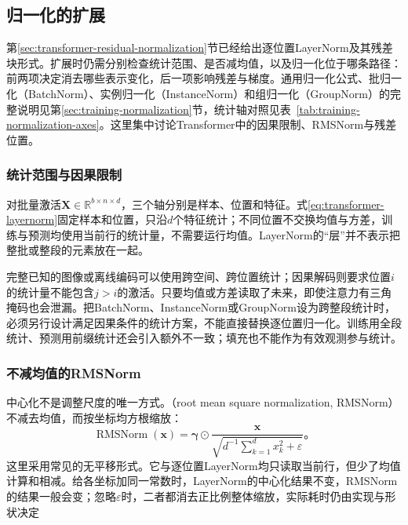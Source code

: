 \subsection{归一化的扩展}
\label{sec:transformer-normalization-extensions}

第\ref{sec:transformer-residual-normalization}节已经给出逐位置LayerNorm及其残差块形式。扩展时仍需分别检查统计范围、是否减均值，以及归一化位于哪条路径：前两项决定消去哪些表示变化，后一项影响残差与梯度。通用归一化公式、批归一化（BatchNorm）、实例归一化（InstanceNorm）和组归一化（GroupNorm）的完整说明见第\ref{sec:training-normalization}节，统计轴对照见表~\ref{tab:training-normalization-axes}。这里集中讨论Transformer中的因果限制、RMSNorm与残差位置。

\subsubsection{统计范围与因果限制}

对批量激活$\bm X\in\mathbb R^{b\times n\times d}$，三个轴分别是样本、位置和特征。式\eqref{eq:transformer-layernorm}固定样本和位置，只沿$d$个特征统计；不同位置不交换均值与方差，训练与预测均使用当前行的统计量，不需要运行均值。LayerNorm的“层”并不表示把整批或整段的元素放在一起。

完整已知的图像或离线编码可以使用跨空间、跨位置统计；因果解码则要求位置$i$的统计量不能包含$j>i$的激活。只要均值或方差读取了未来，即使注意力有三角掩码也会泄漏。把BatchNorm、InstanceNorm或GroupNorm设为跨整段统计时，必须另行设计满足因果条件的统计方案，不能直接替换逐位置归一化。训练用全段统计、预测用前缀统计还会引入额外不一致；填充也不能作为有效观测参与统计。

\subsubsection{不减均值的RMSNorm}

中心化不是调整尺度的唯一方式。（root mean square normalization, RMSNorm）不减去均值，而按坐标均方根缩放：
\begin{equation}
  \operatorname{RMSNorm}(\bm x)
    =\bm\gamma\odot\frac{\bm x}
       {\sqrt{d^{-1}\sum_{k=1}^d x_k^2+\varepsilon}}\text{。}
  \label{eq:transformer-rmsnorm}
\end{equation}
这里采用常见的无平移形式。它与逐位置LayerNorm均只读取当前行，但少了均值计算和相减。给各坐标加同一常数时，LayerNorm的中心化结果不变，RMSNorm的结果一般会变；忽略$\varepsilon$时，二者都消去正比例整体缩放，实际耗时仍由实现与形状决定

